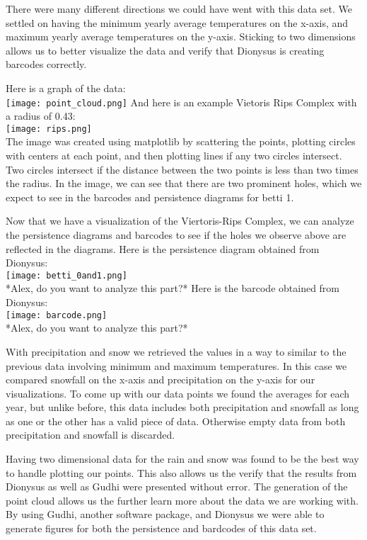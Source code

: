\documentclass[12pt]{report}
\begin{document}
There were many different directions we could have went with this data set. We settled on having the minimum yearly average temperatures on the x-axis, and maximum yearly average temperatures on the y-axis. Sticking to two dimensions allows us to better visualize the data and verify that Dionysus is creating barcodes correctly. \par
Here is a graph of the data:\\
\texttt{[image: point\_cloud.png]}
\clearpage
And here is an example Vietoris Rips Complex with a radius of 0.43:\\
\texttt{[image: rips.png]}\\
The image was created using matplotlib by scattering the points, plotting circles with centers at each point, and then plotting lines if any two circles intersect. Two circles intersect if the distance between the two points is less than two times the radius. In the image, we can see that there are two prominent holes, which we expect to see in the barcodes and persistence diagrams for betti 1.\par
Now that we have a visualization of the Viertoris-Rips Complex, we can analyze the persistence diagrams and barcodes to see if the holes we observe above are reflected in the diagrams.
\clearpage
Here is the persistence diagram obtained from Dionysus:\\
\texttt{[image: betti\_0and1.png]}\\
*Alex, do you want to analyze this part?*
\clearpage
Here is the barcode obtained from Dionysus:\\
\texttt{[image: barcode.png]}\\
*Alex, do you want to analyze this part?*

\clearpage
With precipitation and snow we retrieved the values in a way to similar to the previous data involving minimum and maximum temperatures. In this case we compared snowfall on the x-axis and precipitation on the y-axis for our visualizations. To come up with our data points we found the averages for each year, but unlike before, this data includes both precipitation and snowfall as long as one or the other has a valid piece of data. Otherwise empty data from both precipitation and snowfall is discarded.\par 

Having two dimensional data for the rain and snow was found to be the best way to handle plotting our points. This also allows us the verify that the results from Dionysus as well as Gudhi were presented without error. The generation of the point cloud allows us the further learn more about the data we are working with. By using Gudhi, another software package, and Dionysus we were able to generate figures for both the persistence and bardcodes of this data set.\par
\end{document}
